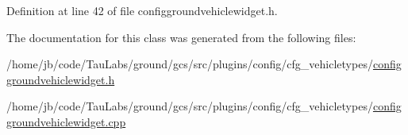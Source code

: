 \-Definition at line 42 of file configgroundvehiclewidget.\-h.



\-The documentation for this class was generated from the following files\-:\begin{DoxyCompactItemize}
\item 
/home/jb/code/\-Tau\-Labs/ground/gcs/src/plugins/config/cfg\-\_\-vehicletypes/\hyperlink{configgroundvehiclewidget_8h}{configgroundvehiclewidget.\-h}\item 
/home/jb/code/\-Tau\-Labs/ground/gcs/src/plugins/config/cfg\-\_\-vehicletypes/\hyperlink{configgroundvehiclewidget_8cpp}{configgroundvehiclewidget.\-cpp}\end{DoxyCompactItemize}
